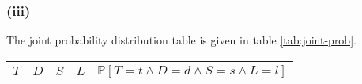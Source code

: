 \documentclass[12pt]{article}
\newcommand{\prob}[1]{\mathbb{P}\left[#1\right]}
\newcommand{\true}{\textsc{true}}
\newcommand{\false}{\textsc{false}}
\begin{document}
    \subsubsection*{(iii)}
    The joint probability distribution table is given in table \ref{tab:joint-prob}.
    \begin{table}[htbp]
        \centering
        \renewcommand{\arraystretch}{1.5}
        \begin{tabular}{cccc|c}
            $T$ & $D$ & $S$ & $L$ & $\prob{T = t \wedge D = d \wedge S = s \wedge L = l}$ \\
            \hline

\end{tabular}
\end{table}
\end{document}
